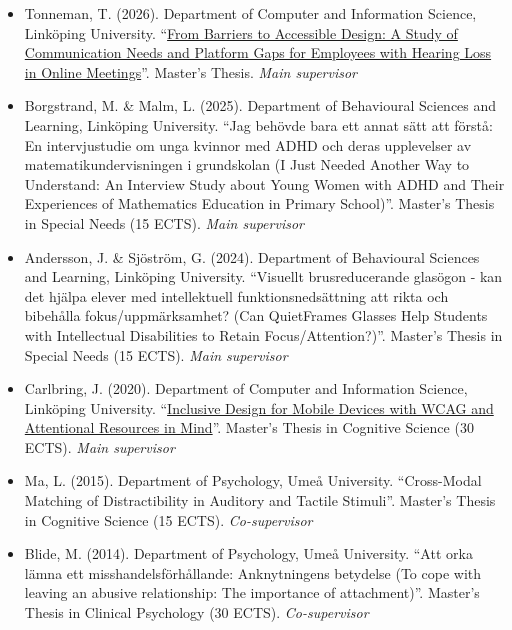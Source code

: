 \documentclass[]{article}
\begin{document}
\begin{itemize}
\item
  Tonneman, T. (2026). Department of Computer and Information Science,
  Linköping University.
  ``\href{https://urn.kb.se/resolve?urn=urn:nbn:se:liu:diva-226238}{From
  Barriers to Accessible Design: A Study of Communication Needs and
  Platform Gaps for Employees with Hearing Loss in Online Meetings}''.
  Master's Thesis. \emph{Main supervisor}
\item
  Borgstrand, M. \& Malm, L. (2025). Department of Behavioural Sciences
  and Learning, Linköping University. ``Jag behövde bara ett annat sätt
  att förstå: En intervjustudie om unga kvinnor med ADHD och deras
  upplevelser av matematikundervisningen i grundskolan (I Just Needed
  Another Way to Understand: An Interview Study about Young Women with
  ADHD and Their Experiences of Mathematics Education in Primary
  School)''. Master's Thesis in Special Needs (15 ECTS). \emph{Main
  supervisor}
\item
  Andersson, J. \& Sjöström, G. (2024). Department of Behavioural
  Sciences and Learning, Linköping University. ``Visuellt
  brusreducerande glasögon - kan det hjälpa elever med intellektuell
  funktionsnedsättning att rikta och bibehålla fokus/uppmärksamhet? (Can
  QuietFrames Glasses Help Students with Intellectual Disabilities to
  Retain Focus/Attention?)''. Master's Thesis in Special Needs (15
  ECTS). \emph{Main supervisor}
\item
  Carlbring, J. (2020). Department of Computer and Information Science,
  Linköping University.
  ``\href{http://liu.diva-portal.org/smash/record.jsf?dswid=-6296&faces-redirect=true&language=en&searchType=SIMPLE&query=Marsja&af=\%5B\%5D&aq=\%5B\%5B\%5D\%5D&aq2=\%5B\%5B\%5D\%5D&aqe=\%5B\%5D&pid=diva2\%3A1441358&noOfRows=50&sortOrder=author_sort_asc&sortOrder2=title_sort_asc&onlyFullText=false&sf=undergraduate}{Inclusive
  Design for Mobile Devices with WCAG and Attentional Resources in
  Mind}''. Master's Thesis in Cognitive Science (30 ECTS). \emph{Main
  supervisor}
\item
  Ma, L. (2015). Department of Psychology, Umeå University.
  ``Cross-Modal Matching of Distractibility in Auditory and Tactile
  Stimuli''. Master's Thesis in Cognitive Science (15 ECTS).
  \emph{Co-supervisor}
\item
  Blide, M. (2014). Department of Psychology, Umeå University. ``Att
  orka lämna ett misshandelsförhållande: Anknytningens betydelse (To
  cope with leaving an abusive relationship: The importance of
  attachment)''. Master's Thesis in Clinical Psychology (30 ECTS).
  \emph{Co-supervisor}
\end{itemize}
\end{document}
